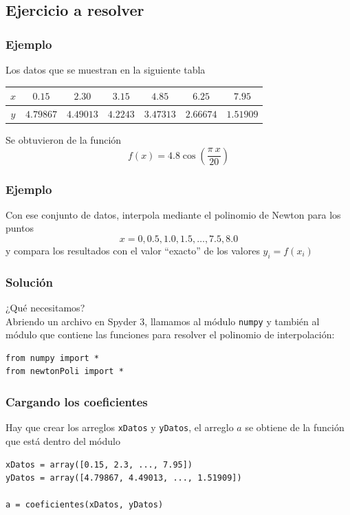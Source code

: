 \subsection{Ejercicio a resolver}
\begin{frame}
\frametitle{Ejemplo}
Los datos que se muestran en la siguiente tabla
\begin{table}[htbp]
\centering \small
\begin{tabulary}{15cm}{c | c | c | c | c | c | c}
$x$ & $0.15$ & $2.30$ & $3.15$ & $4.85$ & $6.25$ & $7.95$ \\
\midrule $y$ & $4.79867$ & $4.49013$ & $4.2243$ & $3.47313$ & $2.66674$ & $1.51909$
\end{tabulary}
\end{table}
Se obtuvieron de la función
\[ f(x) = 4.8 \cos \left( \dfrac{\pi \: x}{20} \right)\]
\end{frame}
\begin{frame}
\frametitle{Ejemplo}
Con ese conjunto de datos, interpola mediante el polinomio de Newton para los puntos
\[ x = 0, 0.5, 1.0, 1.5, \ldots,7.5, 8.0 \]
y compara los resultados con el valor \enquote{exacto} de los valores $y_{i} = f(x_{i})$
\end{frame}
\begin{frame}[fragile]
\frametitle{Solución}
¿Qué necesitamos?
\\
\bigskip
Abriendo un archivo en Spyder 3, llamamos al módulo \texttt{numpy} y también al módulo que contiene las funciones para resolver el polinomio de interpolación:
\begin{lstlisting}[style= FormattedNumber, basicstyle=\linespread{1.1}\ttfamily=\small, columns=fullflexible]
from numpy import *
from newtonPoli import *
\end{lstlisting}
\end{frame}
\begin{frame}[fragile]
\frametitle{Cargando los coeficientes}
Hay que crear los arreglos \texttt{xDatos} y \texttt{yDatos}, el arreglo $a$ se obtiene de la función  que está dentro del módulo 
\begin{lstlisting}[caption=Datos iniciales, style= FormattedNumber, basicstyle=\linespread{1.1}\ttfamily=\small, columns=fullflexible]
xDatos = array([0.15, 2.3, ..., 7.95])
yDatos = array([4.79867, 4.49013, ..., 1.51909])

a = coeficientes(xDatos, yDatos)
\end{lstlisting}
\end{frame}
